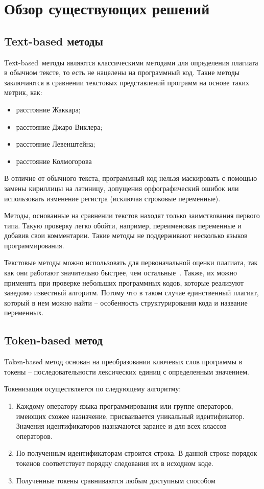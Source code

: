 \section{Обзор существующих решений}

\subsection{Text-based методы}
Text-based методы являются классическими методами для определения плагиата в обычном тексте, то есть не нацелены на программный код. Такие методы заключаются в сравнении текстовых представлений программ на основе таких метрик, как:
\begin{itemize}[label*=---]
	\item расстояние Жаккара;
	\item расстояние Джаро-Виклера;
	\item расстояние Левенштейна;
	\item расстояние Колмогорова
\end{itemize}

В отличие от обычного текста, программный код нельзя маскировать с помощью замены кириллицы на латиницу, допущения орфографический ошибок или использовать изменение регистра (исключая строковые переменные).

Методы, основанные на сравнении текстов находят только заимствования первого типа. Такую проверку легко обойти, например, переименовав переменные и добавив свои комментарии. Такие методы не поддерживают несколько языков программирования. 

Текстовые методы можно использовать для первоначальной оценки плагиата, так как они работают значительно быстрее, чем остальные~\cite{text}. Также, их можно применять при проверке небольших программных кодов, которые реализуют заведомо известный алгоритм. Потому что в таком случае единственный плагиат, который в нем можно найти -- особенность структурирования кода и название переменных. 

\subsection{Token-based метод}
Token-based метод основан на преобразовании ключевых слов программы в токены -- последовательности лексических единиц с определенным значением. 

Токенизация осуществляется по следующему алгоритму:
\begin{enumerate}
	\item Каждому оператору языка программирования или группе операторов, имеющих схожее назначение, присваивается уникальный идентификатор. Значения идентификаторов назначаются заранее и для
	всех классов операторов.
	\item По полученным идентификаторам строится строка. В данной строке порядок токенов соответствует порядку следования их в исходном коде.
	\item Полученные токены сравниваются любым доступным способом
\end{enumerate}

